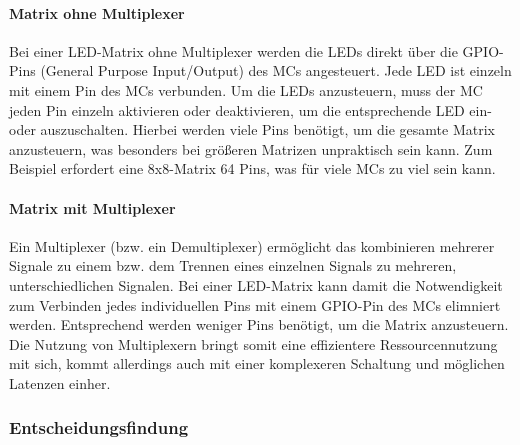 \paragraph{Matrix ohne Multiplexer}

Bei einer LED-Matrix ohne Multiplexer werden die LEDs direkt über die GPIO-Pins (General Purpose Input/Output) des %
\ac{MC}s angesteuert. Jede LED ist einzeln mit einem Pin des \ac{MC}s verbunden. Um die LEDs anzusteuern,
muss der \ac{MC} jeden Pin einzeln aktivieren oder deaktivieren, um die entsprechende LED ein- oder auszuschalten.
Hierbei werden viele Pins benötigt, um die gesamte Matrix anzusteuern, was besonders bei größeren Matrizen unpraktisch
sein kann. Zum Beispiel erfordert eine 8x8-Matrix 64 Pins, was für viele \ac{MC}s zu viel sein kann.


\paragraph{Matrix mit Multiplexer}

Ein Multiplexer (bzw. ein Demultiplexer) ermöglicht das kombinieren mehrerer Signale zu einem bzw. dem Trennen eines einzelnen Signals zu mehreren, unterschiedlichen Signalen.
Bei einer LED-Matrix kann damit die Notwendigkeit zum Verbinden jedes individuellen Pins mit einem GPIO-Pin des \ac{MC}s elimniert werden.
Entsprechend werden weniger Pins benötigt, um die Matrix anzusteuern.
Die Nutzung von Multiplexern bringt somit eine effizientere Ressourcennutzung mit sich, kommt allerdings auch mit einer komplexeren Schaltung und möglichen Latenzen einher. %



\subsubsection{Entscheidungsfindung}


